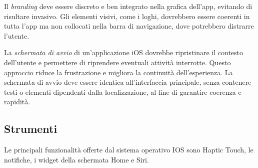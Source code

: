 Il \textit{branding} deve essere discreto e ben integrato nella grafica dell’app, evitando di risultare invasivo. Gli elementi visivi, come i loghi, dovrebbero essere coerenti in tutta l’app ma non collocati nella barra di navigazione, dove potrebbero distrarre l’utente.

La \textit{schermata di avvio} di un’applicazione iOS dovrebbe ripristinare il contesto dell’utente e permettere di riprendere eventuali attività interrotte. Questo approccio riduce la frustrazione e migliora la continuità dell’esperienza. La schermata di avvio deve essere identica all'interfaccia principale, senza contenere testi o elementi dipendenti dalla localizzazione, al fine di garantire coerenza e rapidità.

\subsection{Strumenti}
Le principali funzionalità offerte dal sistema operativo IOS sono Haptic Touch, le notifiche, i widget della schermata Home e Siri.
